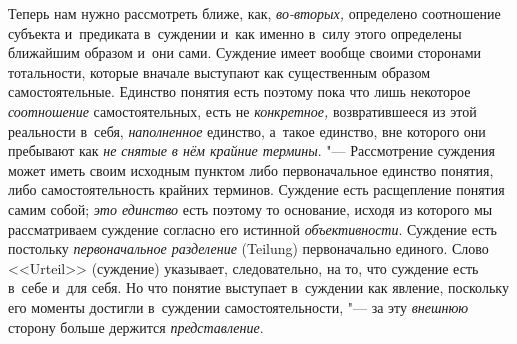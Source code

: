 Теперь нам нужно рассмотреть ближе, как, {\em во-вторых,}
определено соотношение субъекта и~предиката в~суждении и~как
именно в~силу этого определены ближайшим образом и~они сами. Суждение имеет
вообще своими сторонами тотальности, которые вначале выступают как
существенным образом самостоятельные. Единство понятия есть поэтому пока
что лишь некоторое {\em соотношение} самостоятельных, есть не
{\em конкретное,} возвратившееся из этой реальности в~себя, {\em наполненное}
единство, а~такое единство, вне которого они пребывают как {\em не снятые
в нём крайние термины}. "--- Рассмотрение суждения может иметь своим
исходным пунктом либо первоначальное единство понятия, либо
самостоятельность крайних терминов. Суждение есть расщепление понятия самим
собой; {\em это единство} есть поэтому то основание, исходя из которого мы
рассматриваем суждение согласно его истинной {\em объективности}.
Суждение есть постольку {\em первоначальное разделение}
(Teilung) первоначально единого. Слово <<Urteil>> (суждение)
указывает, следовательно, на то, что суждение есть в~себе и~для себя. Но
что понятие выступает в~суждении как явление, поскольку его моменты
достигли в~суждении самостоятельности, "--- за эту {\em внешнюю} сторону
больше держится {\em представление}.

